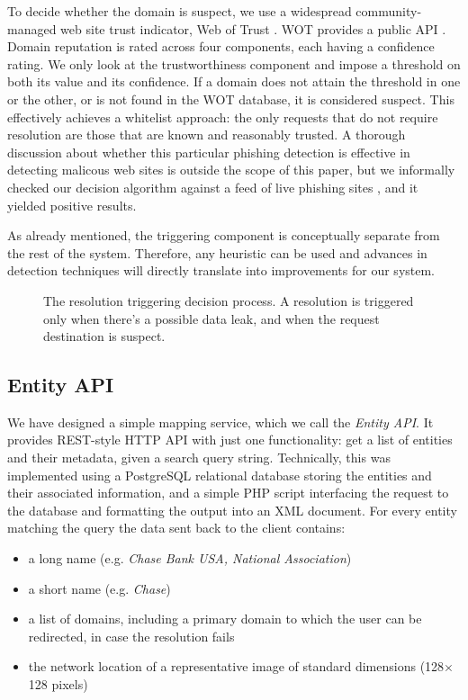 \documentclass[11pt,styles/chicago,a4paper]{article}
\begin{document}
To decide whether the domain is suspect, we use a widespread community-managed web site trust indicator, Web of Trust \cite{wot}. WOT provides a public API \cite{wotapi}. Domain reputation is rated across four components, each having a confidence rating. We only look at the trustworthiness component and impose a threshold on both its value and its confidence. If a domain does not attain the threshold in one or the other, or is not found in the WOT database, it is considered suspect. This effectively achieves a whitelist approach: the only requests that do not require resolution are those that are known and reasonably trusted. A thorough discussion about whether this particular phishing detection is effective in detecting malicous web sites is outside the scope of this paper, but we informally checked our decision algorithm against a feed of live phishing sites \cite{phishtank}, and it yielded positive results.

As already mentioned, the triggering component is conceptually separate from the rest of the system. Therefore, any heuristic can be used and advances in detection techniques will directly translate into improvements for our system.

\begin{figure}[t]
  \caption{The resolution triggering decision process. A resolution is triggered only when there's a possible data leak, and when the request destination is suspect.}
  \label{fig:decisiondgrm}
\end{figure}

\subsection{Entity API}

We have designed a simple mapping service, which we call the \emph{Entity API}. It provides REST-style HTTP API with just one functionality: get a list of entities and their metadata, given a search query string. Technically, this was implemented using a PostgreSQL relational database storing the entities and their associated information, and a simple PHP script interfacing the request to the database and formatting the output into an XML document. For every entity matching the query the data sent back to the client contains:

\begin{itemize}
\item a long name (e.g. \emph{Chase Bank USA, National Association})
\item a short name (e.g. \emph{Chase})
\item a list of domains, including a primary domain to which the user can be redirected, in case the resolution fails
\item the network location of a representative image of standard dimensions (128$\times$128 pixels)
\end{itemize}
\end{document}
